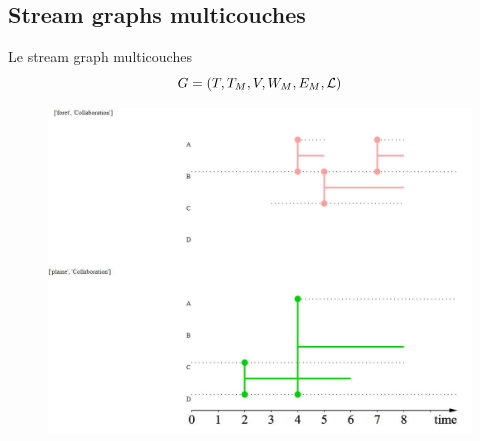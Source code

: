 \documentclass[15pt]{beamer}
\def \stgm {stream graph multicouches}
\def \Stgms {Stream graphs multicouches}
\begin{document}
\subsection{\Stgms{}}
\begin{frame}{Le \stgm{}}
\[
G=(T,T_M,V,W_M,E_M,\cal{L})
\]

\begin{figure}
    \centering
    \includegraphics[width=0.7\linewidth]{img/exMultiStream.JPG}
\end{figure}
\end{frame}
\end{document}
